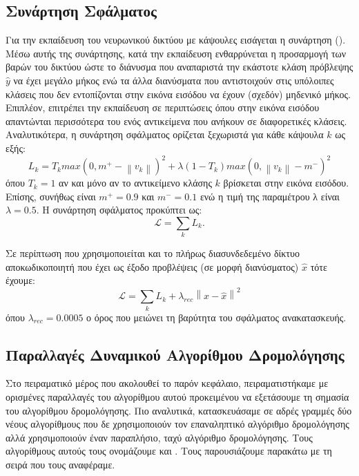 \subsection{Συνάρτηση Σφάλματος}
\label{sec:method1_loss_fn}
Για την εκπαίδευση του νευρωνικού δικτύου με κάψουλες εισάγεται η συνάρτηση  (). Μέσω αυτής της συνάρτησης, κατά την εκπαίδευση ενθαρρύνεται η προσαρμογή των βαρών του δικτύου ώστε το διάνυσμα  που αναπαριστά την εκάστοτε κλάση πρόβλεψης $\hat{y}$ να έχει μεγάλο μήκος ενώ τα άλλα διανύσματα που αντιστοιχούν στις υπόλοιπες κλάσεις που δεν εντοπίζονται στην εικόνα εισόδου να έχουν (σχεδόν) μηδενικό μήκος. Επιπλέον, επιτρέπει την εκπαίδευση σε περιπτώσεις όπου στην εικόνα εισόδου απαντώνται περισσότερα του ενός αντικείμενα που ανήκουν σε διαφορετικές κλάσεις. Αναλυτικότερα, η συνάρτηση σφάλματος ορίζεται ξεχωριστά για κάθε κάψουλα  $k$ ως εξής:
\begin{equation}
    L_k = T_k max(0, m^+ - \left\lVert v_k\right\rVert)^2 + \lambda (1-T_k) max(0, \left\lVert v_k\right\rVert - m^-)^2
\end{equation}
όπου $T_k = 1$ αν και μόνο αν το αντικείμενο κλάσης $k$ βρίσκεται στην εικόνα εισόδου. Επίσης, συνήθως είναι $m^+ = 0.9$ και $m^- = 0.1$ ενώ η τιμή της παραμέτρου λ είναι $\lambda = 0.5$. Η συνάρτηση σφάλματος προκύπτει ως: \begin{equation}
  \mathcal{L} = \sum_k L_k.
\end{equation}

Σε περίπτωση που χρησιμοποιείται και το πλήρως διασυνδεδεμένο δίκτυο αποκωδικοποιητή που έχει ως έξοδο προβλέψεις (σε μορφή διανύσματος) $\hat{x}$ τότε έχουμε: 
\begin{equation}
\mathcal{L} = \sum_k L_k + \lambda_{rec} \left\lVert x - \hat{x}\right\rVert^2 
\end{equation}
όπου $\lambda_{rec} = 0.0005$ ο όρος που μειώνει τη βαρύτητα του σφάλματος ανακατασκευής.

\subsection{Παραλλαγές Δυναμικού Αλγορίθμου Δρομολόγησης}

Στο πειραματικό μέρος που ακολουθεί το παρόν κεφάλαιο, πειραματιστήκαμε με ορισμένες παραλλαγές του αλγορίθμου αυτού προκειμένου να εξετάσουμε τη σημασία του αλγορίθμου δρομολόγησης. Πιο αναλυτικά, κατασκευάσαμε σε αδρές γραμμές δύο νέους αλγορίθμους που δε χρησιμοποιούν τον επαναληπτικό αλγόριθμο δρομολόγησης αλλά χρησιμοποιούν έναν παραπλήσιο, ταχύ αλγόριθμο δρομολόγησης. Τους αλγορίθμους αυτούς τους ονομάζουμε  και . Τους παρουσιάζουμε παρακάτω με τη σειρά που τους αναφέραμε.

